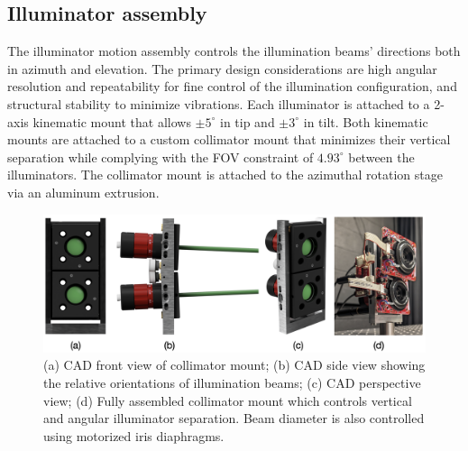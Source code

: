 \subsection{Illuminator assembly}
The illuminator motion assembly controls the illumination beams' directions both in azimuth and elevation. The primary design considerations are high angular resolution and repeatability for fine control of the illumination configuration, and structural stability to minimize vibrations. Each illuminator is attached to a 2-axis kinematic mount that allows $\pm 5^\circ$ in tip and  $\pm 3^\circ$ in tilt. Both kinematic mounts are attached to a custom collimator mount that minimizes their vertical separation while complying with the FOV constraint of $4.93^\circ$ between the illuminators. The collimator mount is attached to the azimuthal rotation stage via an aluminum extrusion.

\begin{figure}
    \centering
    \includegraphics[width=\linewidth]{figures/collimator_assembly_summary.png}
    \caption{(a) CAD front view of collimator mount; (b) CAD side view showing the relative orientations of illumination beams; (c) CAD perspective view; (d) Fully assembled collimator mount which controls vertical and angular illuminator separation. Beam diameter is also controlled using motorized iris diaphragms.}
    \label{fig:collimator_mount}
\end{figure}

